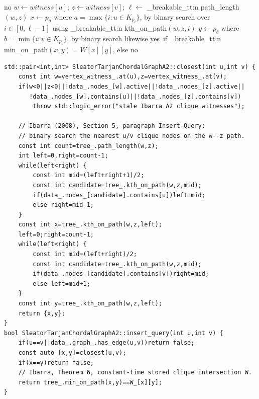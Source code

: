 \documentclass[11pt,a4paper,oneside]{report}
\theoremstyle{plain}
\theoremstyle{definition}
\theoremstyle{remark}
\newcommand{\yes}{\textsf{yes}}
\newcommand{\no}{\textsf{no}}
\newcommand{\op}[1]{\textsf{#1}}
\DeclareRobustCommand{\code}[1]{\mtp_breakable_tt:n {#1}}
\DeclareRobustCommand{\file}[1]{\mtp_breakable_tt:n {#1}}
\begin{document}
\begin{algorithm}[ht]
\caption{A2 \op{Insert-Query}\((u,v)\) (Ibarra \S5, p.\,40:12)}\label{alg:a2-iq}
\begin{algorithmic}[1]
 \Return \no \EndIf \Comment{\(O(\log n)\) with \code{std::set}}
\State \(w\gets\mathit{witness}[u]\); \(z\gets\mathit{witness}[v]\); \(\ell\gets\) \code{path_length}\((w,z)\)
\State \(x\gets p_a\) where \(a=\max\{i: u\in K_{p_i}\}\), by binary search over \(i\in[0,\ell-1]\) using \code{kth_on_path}\((w,z,i)\)
\State \(y\gets p_b\) where \(b=\min\{i: v\in K_{p_i}\}\), by binary search likewise
\State \Return \yes\ if \code{min_on_path}\((x,y)=W[x][y]\), else \no {}
\end{algorithmic}
\end{algorithm}

\begin{lstlisting}[style=cpp,firstnumber=67,caption={\file{src/dynamic_ibarra_a2.cpp}, lines 67--100: closest pair by binary search and \op{Insert-Query}.},label={lst:a2-iq}]
std::pair<int,int> SleatorTarjanChordalGraphA2::closest(int u,int v) {
    const int w=vertex_witness_.at(u),z=vertex_witness_.at(v);
    if(w<0||z<0||!data_.nodes_[w].active||!data_.nodes_[z].active||
       !data_.nodes_[w].contains[u]||!data_.nodes_[z].contains[v])
        throw std::logic_error("stale Ibarra A2 clique witnesses");

    // Ibarra (2008), Section 5, paragraph Insert-Query:
    // binary search the nearest u/v clique nodes on the w--z path.
    const int count=tree_.path_length(w,z);
    int left=0,right=count-1;
    while(left<right) {
        const int mid=(left+right+1)/2;
        const int candidate=tree_.kth_on_path(w,z,mid);
        if(data_.nodes_[candidate].contains[u])left=mid;
        else right=mid-1;
    }
    const int x=tree_.kth_on_path(w,z,left);
    left=0;right=count-1;
    while(left<right) {
        const int mid=(left+right)/2;
        const int candidate=tree_.kth_on_path(w,z,mid);
        if(data_.nodes_[candidate].contains[v])right=mid;
        else left=mid+1;
    }
    const int y=tree_.kth_on_path(w,z,left);
    return {x,y};
}
bool SleatorTarjanChordalGraphA2::insert_query(int u,int v) {
    if(u==v||data_.graph_.has_edge(u,v))return false;
    const auto [x,y]=closest(u,v);
    if(x==y)return false;
    // Ibarra, Theorem 6, constant-time stored clique intersection W.
    return tree_.min_on_path(x,y)==W_[x][y];
}
\end{lstlisting}
\end{document}
